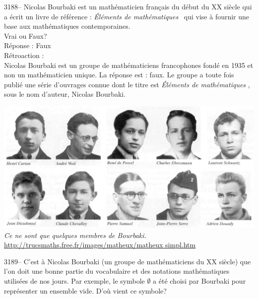 \documentclass[letterpaper, 12pt]{article}
\begin{document}
3188-- Nicolas Bourbaki est un math\'ematicien fran\c cais du d\'ebut du {\scriptsize XX\ieme{}} si\`ecle qui a \'ecrit un livre de r\'ef\'erence : \og \emph{\'El\'ements de math\'ematiques} \fg \ qui vise \`a fournir une base aux math\'ematiques contemporaines.\\
Vrai ou Faux?\\

R\'eponse : Faux\\

R\'etroaction :\\
Nicolas Bourbaki est un groupe de math\'ematiciens francophones fond\'e en 1935 et non un math\'ematicien unique. La r\'eponse est : faux. Le groupe a toute fois publi\'e une s\'erie d'ouvrages connue dont le titre est \og \emph{\'El\'ements de math\'ematiques} \fg, sous le nom d'auteur, Nicolas Bourbaki.
\begin{center}
\includegraphics[scale=0.25]{bourbaki.eps}\\
\emph{{\small Ce ne sont que quelques membres de Bourbaki.}}\\
\href{http://trucsmaths.free.fr/images/matheux/matheux_simpl.htm#B}{http://trucsmaths.free.fr/images/matheux/matheux simpl.htm}\\[5mm]
\end{center}



3189-- C'est \`a Nicolas Bourbaki (un groupe de math\'ematiciens du {\scriptsize XX\ieme{}} si\`ecle) que l'on doit une bonne partie du vocabulaire et des notations math\'ematiques utilis\'ees de nos jours. Par exemple, le symbole $\emptyset$ a \'et\'e choisi par Bourbaki pour repr\'esenter un ensemble vide. D'o\`u vient ce symbole?\\
\end{document}
